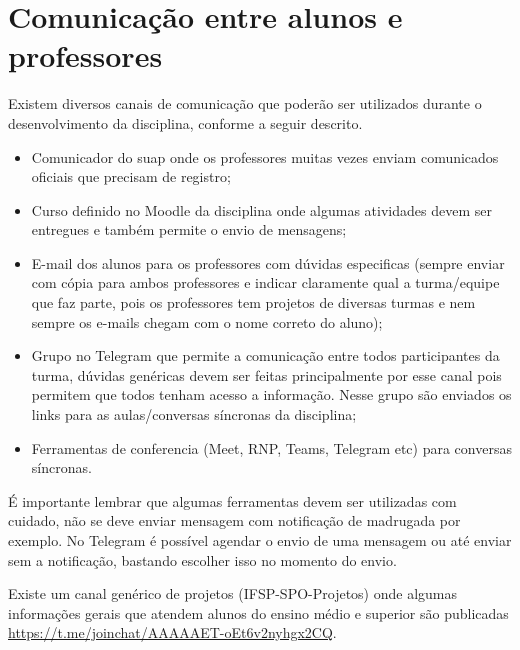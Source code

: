 \section{Comunicação entre alunos e professores}
Existem diversos canais de comunicação que poderão ser utilizados durante o desenvolvimento da disciplina, conforme a seguir descrito.
\begin{itemize}
    \item Comunicador do \ac{suap} onde os professores muitas vezes enviam comunicados oficiais que precisam de registro;
    
    \item Curso definido no Moodle da disciplina onde algumas atividades devem ser entregues e também permite o envio de mensagens;
    
    \item E-mail dos alunos para os professores com dúvidas especificas (sempre enviar com cópia para ambos professores e indicar claramente qual a turma/equipe que faz parte, pois os professores tem projetos de diversas turmas e nem sempre os e-mails chegam com o nome correto do aluno);
    
    \item Grupo no Telegram que permite a comunicação entre todos participantes da turma, dúvidas genéricas devem ser feitas principalmente por esse canal pois permitem que todos tenham acesso a informação. Nesse grupo são enviados os links para as aulas/conversas síncronas da disciplina;
    
    \item Ferramentas de conferencia (Meet, RNP, Teams, Telegram  etc) para conversas síncronas.
    
\end{itemize}

É importante lembrar que algumas ferramentas devem ser utilizadas com cuidado, não se deve enviar mensagem com notificação de madrugada por exemplo. No Telegram é possível agendar o envio de uma mensagem ou até enviar sem a notificação, bastando escolher isso no momento do envio.

Existe um canal genérico de projetos (IFSP-SPO-Projetos) onde algumas informações gerais que atendem alunos do ensino médio e superior são publicadas \url{https://t.me/joinchat/AAAAAET-oEt6v2nyhgx2CQ}.







